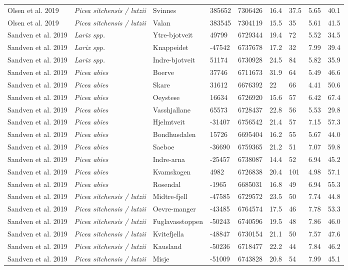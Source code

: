 \documentclass[
]{article}
\begin{document}
\begin{landscape}
\begin{longtable}[t]{l>{}llllllll}
Olsen et al. 2019 & \em{Picea sitchensis / lutzii} & Svinnes & 385652 & 7306426 & 16.4 & 37.5 & 5.65 & 40.1\\
Olsen et al. 2019 & \em{Picea sitchensis / lutzii} & Valan & 383545 & 7304119 & 15.5 & 35 & 5.61 & 41.5\\
Sandven et al. 2019 & \em{Larix spp.} & Ytre-bjotveit & 49799 & 6729344 & 19.4 & 72 & 5.52 & 34.5\\
Sandven et al. 2019 & \em{Larix spp.} & Knappeidet & -47542 & 6737678 & 17.2 & 32 & 7.99 & 39.4\\
\addlinespace
Sandven et al. 2019 & \em{Larix spp.} & Indre-bjotveit & 51174 & 6730928 & 24.5 & 84 & 5.82 & 35.9\\
Sandven et al. 2019 & \em{Picea abies} & Boerve & 37746 & 6711673 & 31.9 & 64 & 5.49 & 46.6\\
Sandven et al. 2019 & \em{Picea abies} & Skare & 31612 & 6676392 & 22 & 66 & 4.41 & 50.6\\
Sandven et al. 2019 & \em{Picea abies} & Oeystese & 16634 & 6726920 & 15.6 & 57 & 6.42 & 67.4\\
Sandven et al. 2019 & \em{Picea abies} & Vasshjallane & 65573 & 6728437 & 22.8 & 56 & 5.53 & 29.8\\
\addlinespace
Sandven et al. 2019 & \em{Picea abies} & Hjelmtveit & -31407 & 6756542 & 21.4 & 57 & 7.15 & 57.3\\
Sandven et al. 2019 & \em{Picea abies} & Bondhusdalen & 15726 & 6695404 & 16.2 & 55 & 5.67 & 44.0\\
Sandven et al. 2019 & \em{Picea abies} & Saeboe & -36690 & 6759365 & 21.2 & 51 & 7.07 & 59.8\\
Sandven et al. 2019 & \em{Picea abies} & Indre-arna & -25457 & 6738087 & 14.4 & 52 & 6.94 & 45.2\\
Sandven et al. 2019 & \em{Picea abies} & Kvamskogen & 4982 & 6726838 & 20.4 & 101 & 4.98 & 57.1\\
\addlinespace
Sandven et al. 2019 & \em{Picea abies} & Rosendal & -1965 & 6685031 & 16.8 & 49 & 6.94 & 55.3\\
Sandven et al. 2019 & \em{Picea sitchensis / lutzii} & Midtre-fjell & -47585 & 6729572 & 23.5 & 50 & 7.74 & 44.8\\
Sandven et al. 2019 & \em{Picea sitchensis / lutzii} & Oevre-manger & -43485 & 6764574 & 17.5 & 46 & 7.78 & 53.3\\
Sandven et al. 2019 & \em{Picea sitchensis / lutzii} & Fuglavasstoppen & -50243 & 6740596 & 19.5 & 48 & 7.86 & 46.0\\
Sandven et al. 2019 & \em{Picea sitchensis / lutzii} & Kvitefjella & -48847 & 6730154 & 21.1 & 50 & 7.57 & 47.6\\
\addlinespace
Sandven et al. 2019 & \em{Picea sitchensis / lutzii} & Kausland & -50236 & 6718477 & 22.2 & 44 & 7.84 & 46.2\\
Sandven et al. 2019 & \em{Picea sitchensis / lutzii} & Misje & -51009 & 6743828 & 20.8 & 54 & 7.99 & 45.1\\*
\end{longtable}
\end{landscape}
\end{document}
